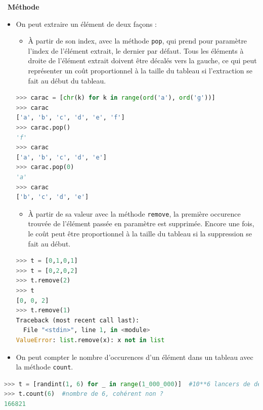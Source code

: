 \documentclass[
  11pt,
]{article}
\newcommand{\passthrough}[1]{#1}
\providecommand{\tightlist}{%
  \setlength{\itemsep}{0pt}\setlength{\parskip}{0pt}}
\newcounter{prop}
\newenvironment{methode}[1]
{\par \medskip    \noindent  
 \begin {bclogo}[arrondi =0.1,logo=\bcoutil, marge=4,noborder = true] {~\textbf{Méthode}   {\itshape #1} }  \par}
{
\end{bclogo}
 \par \bigskip }
\begin{document}
\begin{methode}{}
\begin{itemize}
\item
  On peut extraire un élément de deux façons :

  \begin{itemize}
  \tightlist
  \item
    À partir de son index, avec la méthode
    \passthrough{\lstinline!pop!}, qui prend pour paramètre l'index de
    l'élément extrait, le dernier par défaut. Tous les éléments à droite
    de l'élément extrait doivent être décalés vers la gauche, ce qui
    peut représenter un coût proportionnel à la taille du tableau si
    l'extraction se fait au début du tableau.
  \end{itemize}

\begin{lstlisting}[language=Python]
>>> carac = [chr(k) for k in range(ord('a'), ord('g'))]
>>> carac
['a', 'b', 'c', 'd', 'e', 'f']
>>> carac.pop()
'f'
>>> carac
['a', 'b', 'c', 'd', 'e']
>>> carac.pop(0)
'a'
>>> carac
['b', 'c', 'd', 'e']
\end{lstlisting}

  \begin{itemize}
  \tightlist
  \item
    À partir de sa valeur avec la méthode
    \passthrough{\lstinline!remove!}, la première occurence trouvée de
    l'élément passée en paramètre est supprimée. Encore une fois, le
    coût peut être proportionnel à la taille du tableau si la
    suppression se fait au début.
  \end{itemize}

\begin{lstlisting}[language=Python]
>>> t = [0,1,0,1]
>>> t = [0,2,0,2]
>>> t.remove(2)
>>> t
[0, 0, 2]
>>> t.remove(1)
Traceback (most recent call last):
  File "<stdin>", line 1, in <module>
ValueError: list.remove(x): x not in list
\end{lstlisting}
\item
  On peut compter le nombre d'occurences d'un élément dans un tableau
  avec la méthode \passthrough{\lstinline!count!}.
\end{itemize}

\begin{lstlisting}[language=Python]
>>> t = [randint(1, 6) for _ in range(1_000_000)]  #10**6 lancers de dés 
>>> t.count(6)  #nombre de 6, cohérent non ?
166821
\end{lstlisting}

\end{methode}
\end{document}
